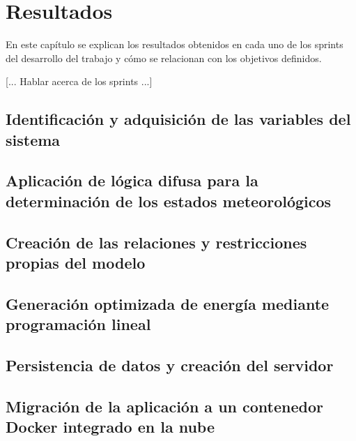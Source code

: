 \chapter{Resultados}
\label{cap:Resultados}
En este capítulo se explican los resultados obtenidos en cada uno de los sprints del desarrollo del trabajo y cómo se relacionan con los objetivos definidos.

[... Hablar acerca de los sprints ...]


\section{Identificación y adquisición de las variables del sistema}

\section{Aplicación de lógica difusa para la determinación de los estados meteorológicos}

\section{Creación de las relaciones y restricciones propias del modelo}

\section{Generación optimizada de energía mediante programación lineal}

\section{Persistencia de datos y creación del servidor}
\section{Migración de la aplicación a un contenedor Docker integrado en la nube}
